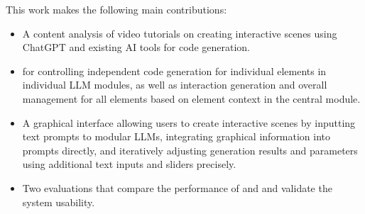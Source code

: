 This work makes the following main contributions:
\begin{itemize}
\item{A content analysis
of video tutorials on creating interactive scenes using ChatGPT and existing AI tools for code generation.}
\item{
for controlling independent code generation for individual elements in individual LLM modules, as well as interaction generation and overall management for all elements based on element context in the central module.}
\item{A graphical interface allowing users to create interactive scenes by inputting text prompts to modular LLMs, integrating graphical information into prompts directly, and iteratively adjusting generation results and parameters using {additional text inputs} %
and sliders precisely.}
\item{Two evaluations that compare the performance of {\sysName} and  and {validate} the system usability.
}
\end{itemize}








